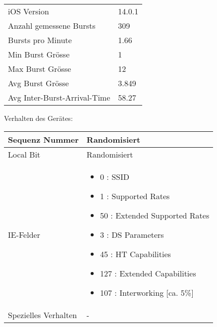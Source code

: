 \begin{table}[h!]
    \begin{tabularx}{\textwidth}{l X }
        \toprule
        iOS Version & 14.0.1\\
        Anzahl gemessene Bursts & 309 \\
        Bursts pro Minute & 1.66 \\
        Min Burst Grösse & 1 \\
        Max Burst Grösse & 12 \\
        Avg Burst Grösse & 3.849 \\
        Avg Inter-Burst-Arrival-Time & 58.27 \\
        \bottomrule
    \end{tabularx}
\end{table}

Verhalten des Gerätes:

\begin{table}[h!]
    \begin{tabularx}{\textwidth}{l X }
        \toprule
        Sequenz Nummer & Randomisiert \\
        \midrule
        Local Bit & Randomisiert \\
        \midrule
        IE-Felder & \begin{itemize}
            \item 0 : SSID
            \item 1 : Supported Rates
            \item 50 : Extended Supported Rates
            \item 3 : DS Parameters
            \item 45 : HT Capabilities 
            \item 127 : Extended Capabilities
            \item 107 : Interworking [ca. 5\%]
        \end{itemize} \\
        \midrule
        Spezielles Verhalten & - \\
        \bottomrule
    \end{tabularx}
\end{table}
\clearpage



